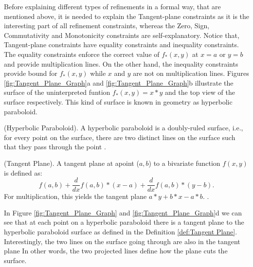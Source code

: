 \noindent Before explaining different types of refinements in a formal way, that are mentioned above, it is needed to explain the Tangent-plane constraints as it is the interesting part of all refinement constraints, whereas the Zero, Sign, Commutativity and Monotonicity constraints are self-explanatory.
Notice that, Tangent-plane constraints have equality constraints and inequality constraints.
The equality constraints enforce the correct value of  $f_{\ast}(x, y)$ at $x = a$ or $y = b$ and provide multiplication lines.
On the other hand, the inequality constraints provide bound for $f_{\ast}(x, y)$ while $x$ and $y$ are not on multiplication lines.
Figures \ref{fig:Tangent_Plane_Graph}a and \ref{fig:Tangent_Plane_Graph}b illustrate the surface of the uninterpreted funtion $f_{\ast}(x, y) = x \ast y$ and the top view of the surface respectively.
This kind of surface is known in geometry as hyperbolic paraboloid.\newline

\begin{definition}
    (Hyperbolic Paraboloid).
    A hyperbolic paraboloid is a doubly-ruled surface, i.e., for every point on the surface, there are two distinct lines on the surface such that they pass through the point \cite{Cimatti:2018:ILS:3274693.3230639}.
 \end{definition}
 
\begin{definition}
\label{def:Tangent Plane}
    (Tangent Plane).
    A tangent plane at apoint ($a, b$) to a bivariate function $f(x, y)$ is defined as:
    $$f(a, b) + \frac{d}{dx} f(a, b) \ast (x-a) + \frac{d}{dx} f(a, b) \ast (y-b).$$
    For multiplication, this yields the tangent plane $a \ast y + b \ast x - a \ast b$.
    \cite{TangentPlane}.
 \end{definition}

\noindent In Figure \ref{fig:Tangent_Plane_Graph} and \ref{fig:Tangent_Plane_Graph}d we can see that at each point on a hyperbolic paraboloid there is a tangent plane to the hyperbolic paraboloid surface as defined in the Definition \ref{def:Tangent Plane}.
Interestingly, the two lines on the surface going through are also in the tangent plane 
In other words, the two projected lines define how the plane cuts the surface.\newpage

